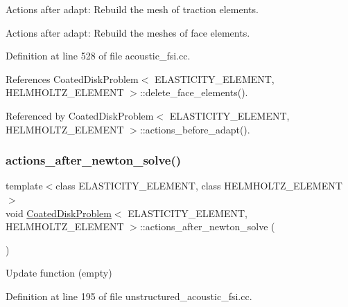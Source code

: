 Actions after adapt\+: Rebuild the mesh of traction elements. 

Actions after adapt\+: Rebuild the meshes of face elements. 

Definition at line 528 of file acoustic\+\_\+fsi.\+cc.



References Coated\+Disk\+Problem$<$ E\+L\+A\+S\+T\+I\+C\+I\+T\+Y\+\_\+\+E\+L\+E\+M\+E\+N\+T, H\+E\+L\+M\+H\+O\+L\+T\+Z\+\_\+\+E\+L\+E\+M\+E\+N\+T $>$\+::delete\+\_\+face\+\_\+elements().



Referenced by Coated\+Disk\+Problem$<$ E\+L\+A\+S\+T\+I\+C\+I\+T\+Y\+\_\+\+E\+L\+E\+M\+E\+N\+T, H\+E\+L\+M\+H\+O\+L\+T\+Z\+\_\+\+E\+L\+E\+M\+E\+N\+T $>$\+::actions\+\_\+before\+\_\+adapt().

\mbox{\label{classCoatedDiskProblem_aa0b9b4e706cdb1b31738c3db8759e9ee}} 
\subsubsection{\texorpdfstring{actions\+\_\+after\+\_\+newton\+\_\+solve()}{actions\_after\_newton\_solve()}\hspace{0.1cm}{\footnotesize\ttfamily [1/2]}}
{\footnotesize\ttfamily template$<$class E\+L\+A\+S\+T\+I\+C\+I\+T\+Y\+\_\+\+E\+L\+E\+M\+E\+NT, class H\+E\+L\+M\+H\+O\+L\+T\+Z\+\_\+\+E\+L\+E\+M\+E\+NT$>$ \\
void \hyperlink{classCoatedDiskProblem}{Coated\+Disk\+Problem}$<$ E\+L\+A\+S\+T\+I\+C\+I\+T\+Y\+\_\+\+E\+L\+E\+M\+E\+NT, H\+E\+L\+M\+H\+O\+L\+T\+Z\+\_\+\+E\+L\+E\+M\+E\+NT $>$\+::actions\+\_\+after\+\_\+newton\+\_\+solve (\begin{DoxyParamCaption}{ }\end{DoxyParamCaption})\hspace{0.3cm}{\ttfamily [inline]}}



Update function (empty) 



Definition at line 195 of file unstructured\+\_\+acoustic\+\_\+fsi.\+cc.

\mbox{\label{classCoatedDiskProblem_aa0b9b4e706cdb1b31738c3db8759e9ee}} 
